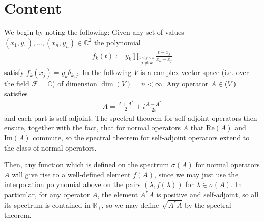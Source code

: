 \documentclass[10pt,twoside,openany,final]{memoir}
\theoremstyle{break}
\theoremstyle{Break}
\let\End\relax
\DeclareMathOperator{\End}{End}
\newcommand{\R}{\mathbb{R}}
\newcommand{\C}{\mathbb{C}}
\newcommand{\F}{\mathcal{F}}
\begin{document}
\section*{Content}
We begin by noting the following: Given any set of values $(x_1,y_1),\dots,(x_n,y_n) \in \C^2$ the polynomial 
\begin{align*}
	f_{k}(t):=y_k \prod_{\stackrel{1 \leq j \leq n}{  j \neq k }} \frac{t-x_j}{x_k-x_j}
\end{align*}
satisfy $f_k(x_j)=y_k \delta_{k,j}$. In the following $V$ is a complex vector space (i.e. over the field $\F=\C$) of dimension $\dim(V)=n< \infty$. Any operator $A \in \End(V)$ satisfies
\begin{align*}
	A=\frac{A+A^*}{2}+i\frac{A-A^*}{2i}
\end{align*}
and each part is self-adjoint. The spectral theorem for self-adjoint operators then ensure, together with the fact, that for normal operators $A$ that $\textrm{Re}(A)$ and $\textrm{Im}(A)$ commute, so the spectral theorem for self-adjoint operators extend to the class of normal operators. 

Then, any function which is defined on the spectrum $\sigma(A)$ for normal operators $A$ will give rise to a well-defined element $f(A)$, since we may just use the interpolation polynomial above on the pairs $(\lambda,f(\lambda))$ for $\lambda \in \sigma(A)$. In particular, for any operator $A$, the element $A^*A$ is positive and self-adjoint, so all its spectrum is contained in $\R_+$, so we may define $\sqrt{A^*A}$ by the spectral theorem.
\end{document}
